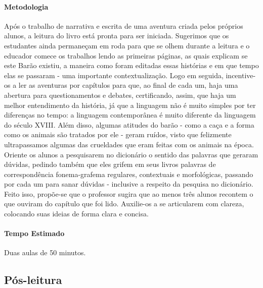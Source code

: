 \documentclass[11pt]{extarticle}
\begin{document}
\paragraph{Metodologia} Após o trabalho de narrativa e escrita de uma aventura criada pelos próprios alunos, a leitura do livro está pronta para ser iniciada. Sugerimos que os estudantes ainda permaneçam em roda para que se olhem durante a leitura e o educador comece os trabalhos lendo as primeiras páginas, as quais explicam se este Barão existiu, a maneira como foram editadas essas histórias e em que tempo elas se passaram - uma importante contextualização. Logo em seguida, incentive-os a ler as aventuras por capítulos para que, ao final de cada um, haja uma abertura para questionamentos e debates, certificando, assim, que haja um melhor entendimento da história, já que a linguagem não é muito simples por ter diferenças no tempo: a linguagem contemporânea é muito diferente da linguagem do século XVIII. Além disso, algumas atitudes do barão - como a caça e a forma como os animais são tratados por ele - geram ruídos, visto que felizmente ultrapassamos algumas das crueldades que eram feitas com os animais na época. Oriente os alunos a pesquisarem no dicionário o sentido das palavras que geraram dúvidas, pedindo também que eles grifem em seus livros palavras de correspondência fonema-grafema regulares, contextuais e morfológicas, passando por cada um para sanar dúvidas - inclusive a respeito da pesquisa no dicionário. Feito isso, propõe-se que o professor sugira que ao menos três alunos recontem o que ouviram do capítulo que foi lido. Auxilie-os a se articularem com clareza, colocando suas ideias de forma clara e concisa.

\paragraph{Tempo Estimado} Duas aulas de 50 minutos.  

\subsection{Pós-leitura}

\end{document}
